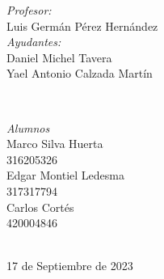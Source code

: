 \begin{titlepage}
    \vspace{10mm}
    \begin{minipage}{0.7\textwidth}
        \begin{flushleft} \large
            \emph{Profesor:}\\
                Luis Germán Pérez Hernández\\
                \vspace{3mm}
                \emph{Ayudantes:}\\
                Daniel Michel Tavera\\
                Yael Antonio Calzada Martín\\
        \end{flushleft}
    \end{minipage}
    \\
    \vspace{10mm}
    \begin{minipage}{0.4\textwidth}
        \begin{flushright} \large
        \centering
            \emph{Alumnos} \\ %
            \vspace{3mm}
            Marco Silva Huerta\\
            316205326\\
            \vspace{4mm}
            Edgar Montiel Ledesma\\
            317317794\\
            \vspace{4mm}
            Carlos Cortés\\
            420004846
        \end{flushright}
    \end{minipage}\\[1.2cm]
    \makeatother
    {\large 17 de Septiembre de 2023}\\[2cm]
    \vfill 
    \end{titlepage}